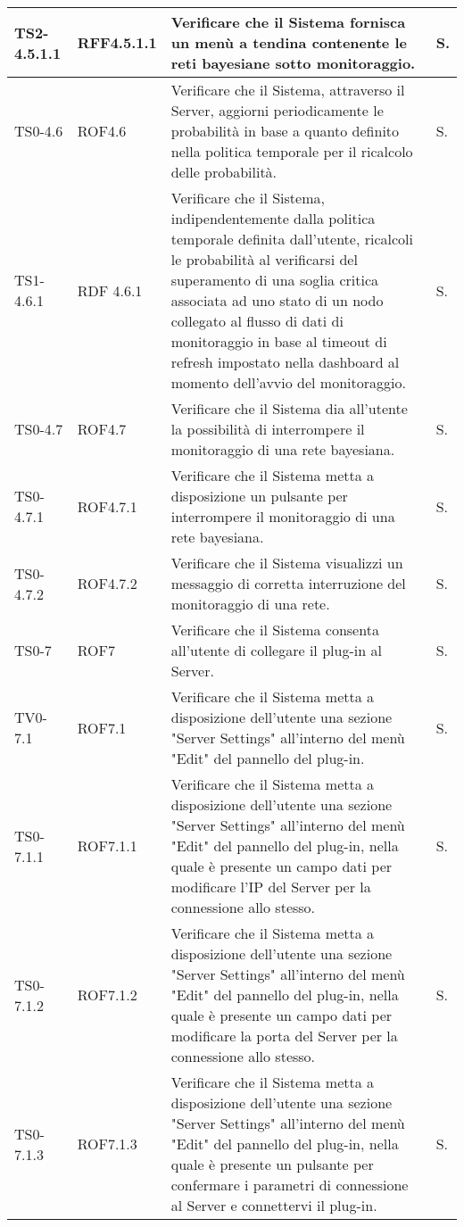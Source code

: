 \begin{longtable}{|C{.15\textwidth}|C{.14\textwidth}|m{.52\textwidth}|m{.08\textwidth}|}
\hline
TS2-4.5.1.1 & RFF4.5.1.1 & Verificare che il Sistema fornisca un menù a  tendina contenente le reti bayesiane sotto monitoraggio. & S. \\
\hline
{}TS0-4.6 & ROF4.6 & Verificare che il Sistema, attraverso il Server, aggiorni periodicamente le probabilità in base a quanto definito nella politica temporale per il ricalcolo delle probabilità. & S. \\
\hline
TS1-4.6.1 & RDF 4.6.1 & Verificare che il Sistema, indipendentemente dalla politica temporale definita dall'utente, ricalcoli le probabilità al verificarsi del superamento di una soglia critica associata ad uno stato di un nodo collegato al flusso di dati di monitoraggio in base al timeout di refresh impostato nella dashboard al momento dell'avvio del monitoraggio. & S. \\
\hline
{}TS0-4.7 & ROF4.7 & Verificare che il Sistema dia all'utente la possibilità di interrompere il monitoraggio di una rete bayesiana. & S. \\
\hline
TS0-4.7.1 & ROF4.7.1 & Verificare che il Sistema metta a disposizione un pulsante per interrompere il monitoraggio di una rete bayesiana. & S. \\
\hline
{}TS0-4.7.2 & ROF4.7.2 & Verificare che il Sistema visualizzi un messaggio di corretta interruzione del monitoraggio di una rete. & S. \\
\hline
TS0-7 & ROF7 & Verificare che il Sistema consenta all'utente di collegare il plug-in al Server. & S. \\
\hline
{}TV0-7.1 & ROF7.1 & Verificare che il Sistema metta a disposizione dell'utente una sezione "Server Settings" all'interno del menù "Edit" del pannello del plug-in. & S. \\
\hline
TS0-7.1.1 & ROF7.1.1 & Verificare che il Sistema metta a disposizione dell'utente una sezione "Server Settings" all'interno del menù "Edit" del pannello del plug-in, nella quale è presente un campo dati per modificare l'IP del Server per la connessione allo stesso. & S. \\
\hline
{}TS0-7.1.2 & ROF7.1.2 & Verificare che il Sistema metta a disposizione dell'utente una sezione "Server Settings" all'interno del menù "Edit" del pannello del plug-in, nella quale è presente un campo dati per modificare la porta del Server per la connessione allo stesso. & S. \\
\hline
TS0-7.1.3 & ROF7.1.3 & Verificare che il Sistema metta a disposizione dell'utente una sezione "Server Settings" all'interno del menù "Edit" del pannello del plug-in, nella quale è presente un pulsante per confermare i parametri di connessione al Server e connettervi il plug-in. & S. \\

\end{longtable}
